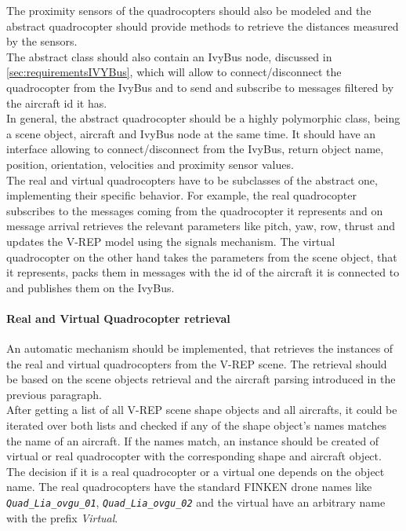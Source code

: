 The proximity sensors of the quadrocopters should also be modeled and the abstract quadrocopter should provide methods to retrieve the distances measured by the sensors.\\
The abstract class should also contain an IvyBus node, discussed in \ref{sec:requirementsIVYBus}, which will allow to connect/disconnect the quadrocopter from the IvyBus and to send and subscribe to messages filtered by the aircraft id it has. \\

In general, the abstract quadrocopter should be a highly polymorphic class, being a scene object, aircraft and IvyBus node at the same time. 
It should have an interface allowing to connect/disconnect from the IvyBus, return object name, position, orientation, velocities and proximity sensor values. \\

The real and virtual quadrocopters have to be subclasses of the abstract one, implementing their specific behavior. 
For example, the real quadrocopter subscribes to the messages coming from the quadrocopter it represents and on message arrival retrieves the relevant parameters like pitch, yaw, row, thrust and updates the V-REP model using the signals mechanism. 
The virtual quadrocopter on the other hand takes the parameters from the scene object, that it represents, packs them in messages with the id of the aircraft it is connected to and publishes them on the IvyBus.

\paragraph{Real and Virtual Quadrocopter retrieval}

An automatic mechanism should be implemented, that retrieves the instances of the real and virtual quadrocopters from the V-REP scene. The retrieval should be based on the scene objects retrieval and the aircraft parsing introduced in the previous paragraph. \\

After getting a list of all V-REP scene shape objects and all aircrafts, it could be iterated over both lists and checked if any of the shape object's names matches the name of an aircraft. If the names match, an instance should be created of virtual or real quadrocopter with the corresponding shape and aircraft object.
The decision if it is a real quadrocopter or a virtual one depends on the object name. The real quadrocopters have the standard FINKEN drone names like \textit{\texttt{Quad\_Lia\_ovgu\_01}}, \textit{\texttt{Quad\_Lia\_ovgu\_02}} and the virtual have an arbitrary name with the prefix \textit{Virtual}.

